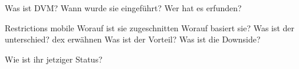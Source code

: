 Was ist DVM? Wann wurde sie eingeführt?
Wer hat es erfunden?

Restrictions mobile
Worauf ist sie zugeschnitten
Worauf basiert sie?
Was ist der unterschied? dex erwähnen
Was ist der Vorteil?
Was ist die Downside?

Wie ist ihr jetziger Status?
